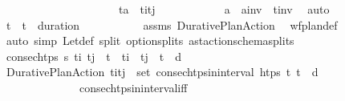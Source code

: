 \begin{isabellebody}
\ \ \ \ \ \ \ \ \ \ \ \ \ \ \ \ \ \ \ \ \ {\isachardoublequoteopen}t\isactrlsub a\ {\isacharequal}{\kern0pt}\ {\isacharparenleft}{\kern0pt}t\isactrlsub i{\isacharplus}{\kern0pt}t\isactrlsub j{\isacharparenright}{\kern0pt}\ {\isacharslash}{\kern0pt}\ {}{\isachardoublequoteclose}\isanewline
\ \ \ \ \ \ \ \ \isamarkupfalse%
\ {\isacartoucheopen}a\ {\isacharequal}{\kern0pt}\ {\isacharquery}{\kern0pt}a\isactrlsub i\isactrlsub n\isactrlsub v\ {\isasymand}\ {\isacharquery}{\kern0pt}t\isactrlsub i\isactrlsub n\isactrlsub v{\isacartoucheclose}\ \isamarkupfalse%
\ auto\isanewline
\ \ \ \ \ \ \isamarkupfalse%
\ {\isachardoublequoteopen}t\isactrlsub {\isasympi}\ {\isasymle}\ t\isactrlsub {\isasympi}\ {\isacharplus}{\kern0pt}\ duration\ {\isasympi}{\isachardoublequoteclose}\isanewline
\ \ \ \ \ \ \ \ \isamarkupfalse%
\ assms\ Durative{\isacharunderscore}{\kern0pt}Plan{\isacharunderscore}{\kern0pt}Action\ \isamarkupfalse%
\ wf{\isacharunderscore}{\kern0pt}plan{\isacharunderscore}{\kern0pt}def\isanewline
\ \ \ \ \ \ \ \ \isamarkupfalse%
\ {\isacharparenleft}{\kern0pt}auto\ simp{\isacharcolon}{\kern0pt}\ Let{\isacharunderscore}{\kern0pt}def\ split{\isacharcolon}{\kern0pt}\ option{\isachardot}{\kern0pt}splits\ ast{\isacharunderscore}{\kern0pt}action{\isacharunderscore}{\kern0pt}schema{\isachardot}{\kern0pt}splits{\isacharparenright}{\kern0pt}\isanewline
\ \ \ \ \ \ \isamarkupfalse%
\ \isamarkupfalse%
\ {\isachardoublequoteopen}consec{\isacharunderscore}{\kern0pt}htps\ {\isasympi}s\ t\isactrlsub i\ t\isactrlsub j\ {\isasymand}\ t\isactrlsub {\isasympi}\ {\isasymle}\ t\isactrlsub i\ {\isasymand}\ t\isactrlsub j\ {\isasymle}\ t\isactrlsub {\isasympi}\ {\isacharplus}{\kern0pt}\ d{\isachardoublequoteclose}\isanewline
\ \ \ \ \ \ \ \ \isamarkupfalse%
\ Durative{\isacharunderscore}{\kern0pt}Plan{\isacharunderscore}{\kern0pt}Action\ {\isacartoucheopen}{\isacharparenleft}{\kern0pt}t\isactrlsub i{\isacharcomma}{\kern0pt}t\isactrlsub j{\isacharparenright}{\kern0pt}\ {\isasymin}\ set\ {\isacharparenleft}{\kern0pt}consec{\isacharunderscore}{\kern0pt}htps{\isacharunderscore}{\kern0pt}in{\isacharunderscore}{\kern0pt}interval\ {\isacharquery}{\kern0pt}htps\ t\isactrlsub {\isasympi}\ {\isacharparenleft}{\kern0pt}t\isactrlsub {\isasympi}\ {\isacharplus}{\kern0pt}\ d{\isacharparenright}{\kern0pt}{\isacharparenright}{\kern0pt}{\isacartoucheclose}\isanewline
\ \ \ \ \ \ \ \ \ \ \ \ \ \ consec{\isacharunderscore}{\kern0pt}htps{\isacharunderscore}{\kern0pt}in{\isacharunderscore}{\kern0pt}interval{\isacharunderscore}{\kern0pt}iff\ \isanewline

\end{isabellebody}
